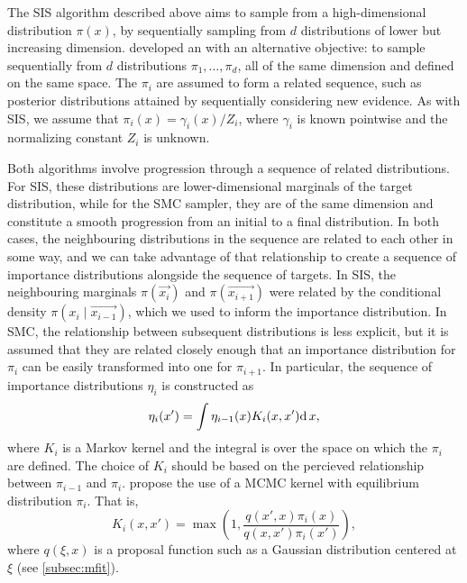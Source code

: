 The \gls{SIS} algorithm described above aims to sample from a high-dimensional
distribution $\pi(x)$, by sequentially sampling from $d$ distributions of lower
but increasing dimension. \textcite{del2006sequential} developed an
 with an alternative objective: to sample sequentially
from $d$ distributions $\pi_1, \ldots, \pi_d$, all of the same dimension and
defined on the same space. The $\pi_i$ are assumed to form a related sequence,
such as posterior distributions attained by sequentially considering new
evidence. As with \gls{SIS}, we assume that $\pi_i(x) = \gamma_i(x) / Z_i$,
where $\gamma_i$ is known pointwise and the normalizing constant $Z_i$ is
unknown.

Both algorithms involve progression through a sequence of related
distributions. For \gls{SIS}, these distributions are lower-dimensional
marginals of the target distribution, while for the \gls{SMC} sampler, they are
of the same dimension and constitute a smooth progression from an initial to a
final distribution. In both cases, the neighbouring distributions in the
sequence are related to each other in some way, and we can take advantage of
that relationship to create a sequence of importance distributions alongside
the sequence of targets. In \gls{SIS}, the neighbouring marginals
$\pi(\vec{x_i})$ and $\pi(\vec{x_{i+1}})$ were related by the conditional
density $\pi(x_i \mid \vec{x_{i-1}})$, which we used to inform the importance
distribution. In \gls{SMC}, the relationship between subsequent distributions
is less explicit, but it is assumed that they are related closely enough that
an importance distribution for $\pi_i$ can be easily transformed into one for
$\pi_{i+1}$. In particular, the sequence of importance distributions $\eta_i$
is constructed as
\begin{align}
  \label{eq:impint}
  \eta_i(x') = \int \eta_{i-1}(x) K_i(x, x') \mathrm{d}\, x,
\end{align}
where $K_i$ is a Markov kernel and the integral is over the space on which the
$\pi_i$ are defined. The choice of $K_i$ should be based on the percieved
relationship between $\pi_{i-1}$ and $\pi_i$. \textcite{del2006sequential}
propose the use of a \gls{MCMC} kernel with equilibrium distribution $\pi_i$.
That is,
\[
  K_i(x, x') = \max\left(1, \frac{q(x', x)\pi_i(x)}{q(x, x')\pi_i(x')}\right),
\]
where $q(\xi, x)$ is a proposal function such as a Gaussian distribution
centered at $\xi$ (see \cref{subsec:mfit}). 

